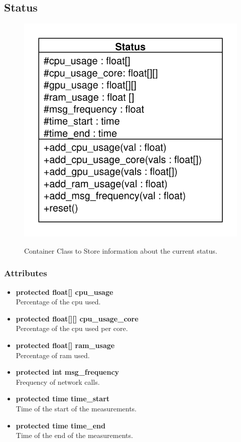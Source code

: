\subsection{Status}
\begin{figure}[htbp]
	\begin{minipage}[t]{7cm}
		\vspace{0pt}
		\centering
		\includegraphics[scale=0.6]{./diagram_pictures/NodeInterface/Status.pdf}
	\end{minipage}
	\hfill
	\begin{minipage}[t]{8cm}
		\vspace{10pt}
		Container Class to Store information about the current status.
	\end{minipage}
\end{figure}


\subsubsection{Attributes}
\begin{itemize}
	\item \textbf{protected float[] cpu\_usage }\\
	Percentage of the cpu used.
	\item \textbf{protected float[][] cpu\_usage\_core}\\
	Percentage of the cpu used per core.
	\item \textbf{protected float[] ram\_usage}\\
	Percentage of ram used.
	\item \textbf{protected int msg\_frequency}\\
	Frequency of network calls.
	\item \textbf{protected time time\_start}\\
	Time of the start of the measurements.
	\item \textbf{protected time time\_end}\\
	Time of the end of the measurements.
\end{itemize}

